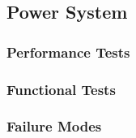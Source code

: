 
\subsection{Power System}
\label{sec:verification_power}

\subsubsection{Performance Tests}
\label{sec:power_pt}

\subsubsection{Functional Tests}
\label{sec:power_ft}

\subsubsection{Failure Modes}
\label{sec:power_fm}